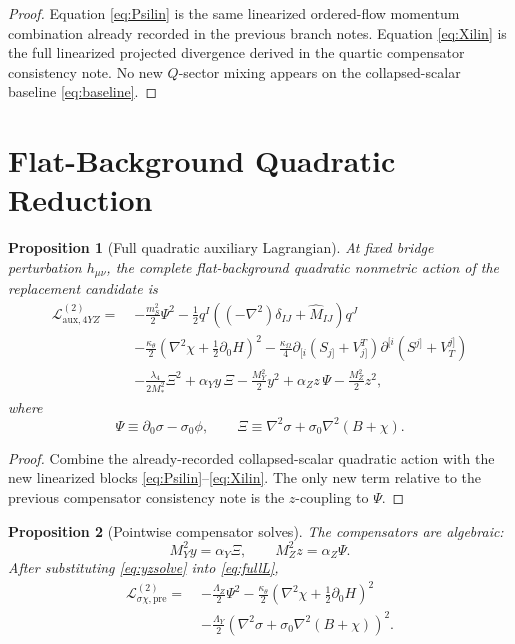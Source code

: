 \documentclass[11pt]{article}
\newtheorem{proposition}{Proposition}
\begin{document}
\begin{proof}
Equation \eqref{eq:Psilin} is the same linearized ordered-flow momentum combination already recorded in the previous branch notes. Equation \eqref{eq:Xilin} is the full linearized projected divergence derived in the quartic compensator consistency note. No new \(Q\)-sector mixing appears on the collapsed-scalar baseline \eqref{eq:baseline}.
\end{proof}

\section{Flat-Background Quadratic Reduction}

\begin{proposition}[Full quadratic auxiliary Lagrangian]
\label{prop:fullL}
At fixed bridge perturbation \(h_{\mu\nu}\), the complete flat-background quadratic nonmetric action of the replacement candidate is
\begin{align}
\mathcal L_{\mathrm{aux},4YZ}^{(2)}
=\;&
-\frac{m_S^2}{2}\Psi^2
-\frac12 q^I\!\left((-\nabla^2)\delta_{IJ}+\widehat M_{IJ}\right)\!q^J
\nonumber\\
&-\frac{\kappa_\theta}{2}
\left(
\nabla^2\chi+\frac12\partial_0H
\right)^2
-\frac{\kappa_\Omega}{4}
\partial_{[i}\!\left(S_{j]}+V_{j]}^T\right)
\partial^{[i}\!\left(S^{j]}+V_T^{j]}\right)
\nonumber\\
&-\frac{\lambda_4}{2M_*^2}\Xi^2
+\alpha_Yy\,\Xi
-\frac{M_Y^2}{2}y^2
+\alpha_Zz\,\Psi
-\frac{M_Z^2}{2}z^2,
\label{eq:fullL}
\end{align}
where
\begin{equation}
\Psi\equiv \partial_0\sigma-\sigma_0\phi,
\qquad
\Xi\equiv \nabla^2\sigma+\sigma_0\nabla^2(B+\chi).
\label{eq:PsiXi}
\end{equation}
\end{proposition}

\begin{proof}
Combine the already-recorded collapsed-scalar quadratic action with the new linearized blocks \eqref{eq:Psilin}--\eqref{eq:Xilin}. The only new term relative to the previous compensator consistency note is the \(z\)-coupling to \(\Psi\).
\end{proof}

\begin{proposition}[Pointwise compensator solves]
\label{prop:yzsolve}
The compensators are algebraic:
\begin{equation}
M_Y^2y=\alpha_Y\Xi,
\qquad
M_Z^2z=\alpha_Z\Psi.
\label{eq:yzsolve}
\end{equation}
After substituting \eqref{eq:yzsolve} into \eqref{eq:fullL},
\begin{align}
\mathcal L_{\sigma\chi,\mathrm{pre}}^{(2)}
=\;&
-\frac{\Lambda_Z}{2}\Psi^2
-\frac{\kappa_\theta}{2}
\left(
\nabla^2\chi+\frac12\partial_0H
\right)^2
\nonumber\\
&-\frac{\Lambda_Y}{2}
\left(
\nabla^2\sigma+\sigma_0\nabla^2(B+\chi)
\right)^2.
\label{eq:Lpre}
\end{align}
\end{proposition}
\end{document}
